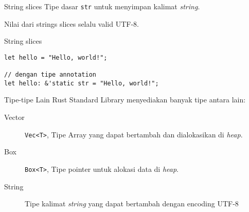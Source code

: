 \documentclass[14pt]{beamer}
\newcommand{\hilite}[1] {%
\texttt{\alert{#1}}}
\begin{document}
\begin{frame}{String slices}
Tipe dasar \hilite{str} untuk menyimpan kalimat \textit{string}.

Nilai dari strings slices selalu valid UTF-8.
\end{frame}

\begin{frame}[fragile]{String slices}
\begin{verbatim}
let hello = "Hello, world!";

// dengan tipe annotation
let hello: &'static str = "Hello, world!";
\end{verbatim}
\end{frame}

%
%

\begin{frame}{Tipe-tipe Lain}
Rust Standard Library menyediakan banyak tipe antara lain:
\begin{description}
    \item [Vector] \hilite{Vec<T>}, Tipe Array yang dapat bertambah dan dialokasikan di \textit{heap}.
    
    \item [Box] \hilite{Box<T>}, Tipe pointer untuk alokasi data di \textit{heap}.
    
    \item [String] Tipe kalimat \textit{string} yang dapat bertambah dengan encoding UTF-8
    
\end{description}
\end{frame}
\end{document}
